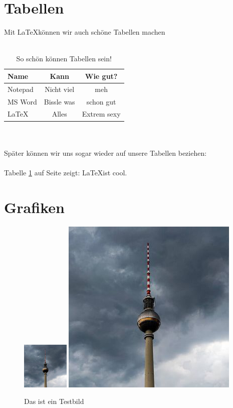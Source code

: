 \documentclass{article}
\begin{document}
\newpage

\section{Tabellen}
Mit \LaTeX können wir auch schöne Tabellen machen\\\\
\begin{table}[h!]
    \centering
    \begin{tabular}{l|c|c}
       Name & Kann & Wie gut? \\\hline\hline
        Notepad & Nicht viel & meh \\
        MS Word & Bissle was & schon gut \\
        \LaTeX & Alles & Extrem sexy
    \end{tabular}
    \caption{So schön können Tabellen sein!}
    \label{tabelle1}
\end{table}
\\\\
Später können wir uns sogar wieder auf unsere Tabellen beziehen: \\\\

Tabelle \ref{tabelle1} auf Seite \pageref{tabelle1} zeigt: \LaTeX ist cool.

\newpage

\section{Grafiken}

\begin{figure}[h!]
     \centering
     \includegraphics[width=0.2\textwidth]{alex.jpg}
     \includegraphics[scale=0.1]{alex.jpg}{}
     \caption{Das ist ein Testbild}
     \label{fig:testbild}
 \end{figure}

\newpage

\printbibliography
\end{document}
